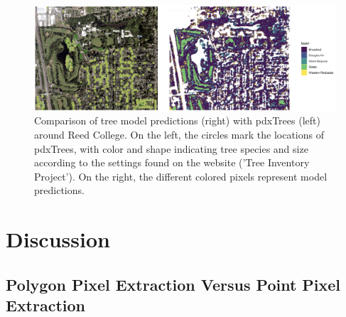 \documentclass[12pt,twoside]{reedthesis}
\begin{document}
\begin{figure}

{\centering \includegraphics[width=1\linewidth]{figure/reedTreesTopdx} 

}

\caption{Comparison of tree model predictions (right) with pdxTrees (left) around Reed College. On the left, the circles mark the locations of pdxTrees, with color and shape indicating tree species and size according to the settings found on the website ('Tree Inventory Project'). On the right, the different colored pixels represent model predictions.}\label{fig:reedTreesTopdx}
\end{figure}
\hypertarget{discussion}{%
\chapter{Discussion}\label{discussion}}

\hypertarget{polygon-pixel-extraction-versus-point-pixel-extraction}{%
\section{Polygon Pixel Extraction Versus Point Pixel Extraction}\label{polygon-pixel-extraction-versus-point-pixel-extraction}}
\end{document}
